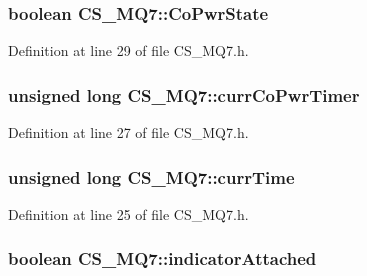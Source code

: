 \subsubsection[{\texorpdfstring{Co\+Pwr\+State}{CoPwrState}}]{\setlength{\rightskip}{0pt plus 5cm}boolean C\+S\+\_\+\+M\+Q7\+::\+Co\+Pwr\+State}\hypertarget{class_c_s___m_q7_ad924851e6f1298b59aec29eb1f965ac4}{}\label{class_c_s___m_q7_ad924851e6f1298b59aec29eb1f965ac4}


Definition at line 29 of file C\+S\+\_\+\+M\+Q7.\+h.

\subsubsection[{\texorpdfstring{curr\+Co\+Pwr\+Timer}{currCoPwrTimer}}]{\setlength{\rightskip}{0pt plus 5cm}unsigned long C\+S\+\_\+\+M\+Q7\+::curr\+Co\+Pwr\+Timer}\hypertarget{class_c_s___m_q7_a7f2c5bf5755a7e28e8916df2626baef7}{}\label{class_c_s___m_q7_a7f2c5bf5755a7e28e8916df2626baef7}


Definition at line 27 of file C\+S\+\_\+\+M\+Q7.\+h.

\subsubsection[{\texorpdfstring{curr\+Time}{currTime}}]{\setlength{\rightskip}{0pt plus 5cm}unsigned long C\+S\+\_\+\+M\+Q7\+::curr\+Time}\hypertarget{class_c_s___m_q7_a70a66cdf74205698a597656cffedf178}{}\label{class_c_s___m_q7_a70a66cdf74205698a597656cffedf178}


Definition at line 25 of file C\+S\+\_\+\+M\+Q7.\+h.

\subsubsection[{\texorpdfstring{indicator\+Attached}{indicatorAttached}}]{\setlength{\rightskip}{0pt plus 5cm}boolean C\+S\+\_\+\+M\+Q7\+::indicator\+Attached}\hypertarget{class_c_s___m_q7_aab84e4777cfe33a4b9d0651ac183f4e5}{}\label{class_c_s___m_q7_aab84e4777cfe33a4b9d0651ac183f4e5}


